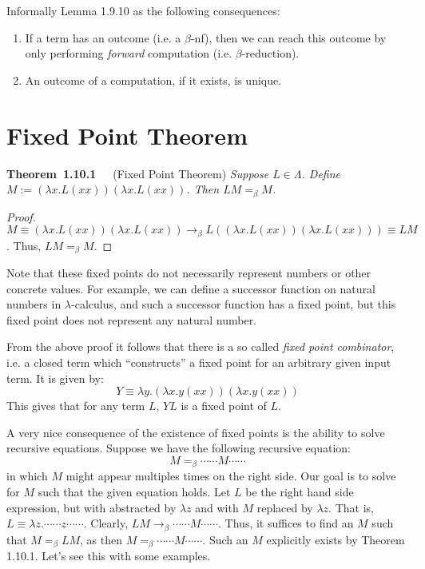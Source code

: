 \documentclass[letterpaper]{article}
\newenvironment{theorem}[2][]{\par\medskip
	\noindent \textbf{Theorem~#2}~~~#1 \rmfamily\em}{\medskip}
\renewcommand{\l}{\lambda}
\newcommand{\beq}{=_\beta}
\newcommand{\bnf}{$\beta$-nf\xspace}
\newcommand{\betaro}{\rightarrow_\beta}
\begin{document}
Informally Lemma 1.9.10 as the following consequences:
\begin{enumerate}
	\item If a term has an outcome (i.e. a \bnf), then we can reach this outcome by only performing \emph{forward} computation (i.e. $\beta$-reduction).
	\item An outcome of a computation, if it exists, is unique.
\end{enumerate}

\section{Fixed Point Theorem}

\begin{theorem}[(Fixed Point Theorem)]{1.10.1}
	Suppose $L \in \Lambda$. Define $M := (\l x. L(x x))(\l x . L(x x))$. Then $L M \beq M$.
\end{theorem}
\begin{proof}
	$M \equiv (\l x. L(x x))(\l x . L(x x)) \betaro L ((\l x . L(x x))(\l x . L(x x))) \equiv L M$. Thus, $LM \beq M$.
\end{proof}

Note that these fixed points do not necessarily represent numbers or other concrete values. For example, we can define a successor function on natural numbers in $\l$-calculus, and such a successor function has a fixed point, but this fixed point does not represent any natural number.

From the above proof it follows that there is a so called \emph{fixed point combinator}, i.e. a closed term which ``constructs'' a fixed point for an arbitrary given input term. It is given by:
\[
	Y \equiv \l y . (\l x . y (x x))(\l x . y (x x))
\]
This gives that for any term $L$, $YL$ is a fixed point of $L$.

A very nice consequence of the existence of fixed points is the ability to solve recursive equations. Suppose we have the following recursive equation:
\[
	M \beq \boxed{ \cdots \cdots M \cdots \cdots }
\]
in which $M$ might appear multiples times on the right side. Our goal is to solve for $M$ such that the given equation holds. Let $L$ be the right hand side expression, but with abstracted by $\l z$ and with $M$ replaced by $\l z$. That is, $L \equiv \l z . \boxed{ \cdots \cdots z \cdots \cdots}$. Clearly, $LM \betaro \boxed{ \cdots \cdots M \cdots \cdots }$. Thus, it suffices to find an $M$ such that $M \beq L M$, as then $M \beq \boxed{ \cdots \cdots M \cdots \cdots }$. Such an $M$ explicitly exists by Theorem 1.10.1. Let's see this with some examples.
\end{document}
